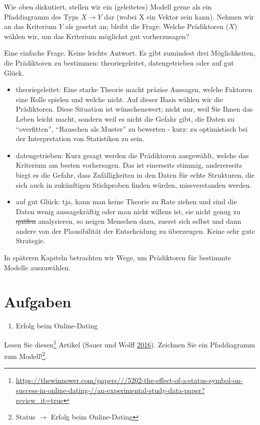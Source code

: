 \documentclass[12pt,ngerman,]{book}
\providecommand{\tightlist}{%
  \setlength{\itemsep}{0pt}\setlength{\parskip}{0pt}}
\let\rmarkdownfootnote\footnote%
\def\footnote{\protect\rmarkdownfootnote}
\theoremstyle{definition}
\theoremstyle{definition}
\theoremstyle{remark}
\begin{document}
Wie oben diskutiert, stellen wir ein (geleitetes) Modell gerne als ein
Pfaddiagramm des Typs \(X \rightarrow Y\) dar (wobei X ein Vektor sein
kann). Nehmen wir an das Kriterium \(Y\) als gesetzt an; bleibt die
Frage: Welche Prädiktoren (\(X\)) wählen wir, um das Kriterium möglichst
gut vorherzusagen?

Eine einfache Frage. Keine leichte Antwort. Es gibt zumindest drei
Möglichkeiten, die Prädiktoren zu bestimmen: theoriegeleitet,
datengetrieben oder auf gut Glück.

\begin{itemize}
\item
  theoriegeleitet: Eine starke Theorie macht präzise Aussagen, welche
  Faktoren eine Rolle spielen und welche nicht. Auf dieser Basis wählen
  wir die Prädiktoren. Diese Situation ist wünschenswert; nicht nur,
  weil Sie Ihnen das Leben leicht macht, sondern weil es nicht die
  Gefahr gibt, die Daten zu ``overfitten'', ``Rauschen als Muster'' zu
  bewerten - kurz: zu optimistisch bei der Interpretation von
  Statistiken zu sein.
\item
  datengetrieben: Kurz gesagt werden die Prädiktoren ausgewählt, welche
  das Kriterium am besten vorhersagen. Das ist einerseits stimmig,
  andererseits birgt es die Gefahr, dass Zufälligkeiten in den Daten für
  echte Strukturen, die sich auch in zukünftigen Stichproben finden
  würden, missverstanden werden.
\item
  auf gut Glück: tja, kann man keine Theorie zu Rate ziehen und sind die
  Daten wenig aussagekräftig oder man nicht willens ist, sie nicht genug
  zu \sout{quälen} analysieren, so neigen Menschen dazu, zuerst sich
  selbst und dann andere von der Plausibilität der Entscheidung zu
  überzeugen. Keine sehr gute Strategie.
\end{itemize}

In späteren Kapiteln betrachten wir Wege, um Prädiktoren für bestimmte
Modelle auszuwählen.

\section{Aufgaben}\label{aufgaben-10}

\begin{enumerate}
\def\labelenumi{\arabic{enumi}.}
\tightlist
\item
  Erfolg beim Online-Dating
\end{enumerate}

Lesen Sie diesen\footnote{\url{https://thewinnower.com/papers///5202-the-effect-of-a-status-symbol-on-success-in-online-dating-//an-experimental-study-data-paper?review_it=true}}
Artikel (Sauer und Wolff \protect\hyperlink{ref-sauer_wolff}{2016}).
Zeichnen Sie ein Pfaddiagramm zum Modell!\footnote{Status
  \(\rightarrow\) Erfolg beim Online-Dating}.
\end{document}
